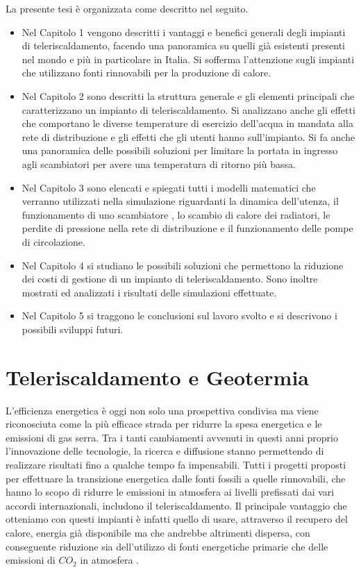 \documentclass[laurea,oneside,11pt]{USiena_tesiLM3}
\begin{document}
La presente tesi è organizzata come descritto nel seguito.

\begin{itemize}
\item[]Nel Capitolo 1 vengono descritti i vantaggi e benefici generali degli impianti di  teleriscaldamento, facendo una panoramica su quelli già esistenti presenti nel mondo e più in particolare in Italia. Si sofferma l'attenzione sugli impianti che utilizzano fonti rinnovabili per la produzione di calore.\\

\item[]Nel Capitolo 2  sono descritti la struttura generale e gli elementi principali che caratterizzano un impianto di teleriscaldamento. Si analizzano anche gli effetti che comportano le diverse temperature di esercizio dell'acqua in mandata alla rete di distribuzione e gli effetti che gli utenti hanno sull'impianto. Si fa anche una panoramica delle possibili soluzioni per limitare la portata in ingresso agli scambiatori per avere una temperatura di ritorno più bassa.

\item[]Nel Capitolo 3 sono elencati e spiegati tutti i modelli matematici  che verranno utilizzati nella simulazione riguardanti la dinamica dell'utenza, il funzionamento di uno scambiatore , lo scambio di calore dei radiatori, le perdite di pressione nella rete di distribuzione e il funzionamento delle pompe di circolazione.

\item[]Nel Capitolo 4 si studiano le possibili soluzioni che permettono la riduzione dei costi di gestione di un impianto di teleriscaldamento. Sono inoltre mostrati ed analizzati i risultati delle simulazioni effettuate.

\item[]Nel Capitolo 5 si traggono le conclusioni sul lavoro svolto e si descrivono i possibili sviluppi futuri. 

\end{itemize}
\chapter{Teleriscaldamento e Geotermia}
L'efficienza energetica è oggi non solo una prospettiva condivisa ma viene riconosciuta come la più efficace strada per ridurre la spesa energetica e le emissioni di gas serra. Tra i tanti cambiamenti avvenuti in questi anni proprio l'innovazione delle tecnologie, la ricerca e diffusione stanno permettendo di realizzare risultati fino a qualche tempo fa impensabili. Tutti i progetti proposti per effettuare la transizione energetica dalle fonti fossili a quelle rinnovabili, che hanno lo scopo di ridurre le emissioni in atmosfera ai livelli prefissati dai vari accordi internazionali, includono il teleriscaldamento.
Il principale vantaggio che otteniamo con questi impianti è infatti quello di usare, attraverso il recupero del calore, energia già disponibile ma che andrebbe altrimenti dispersa, con conseguente riduzione sia dell'utilizzo di fonti energetiche primarie che delle emissioni di $CO_2$ in atmosfera \cite{lund_}.\\
\end{document}
